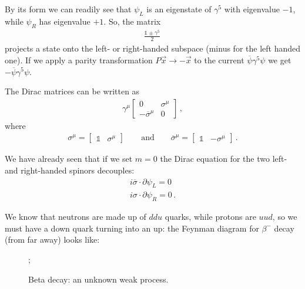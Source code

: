\documentclass[main.tex]{subfiles}
\begin{document}
By its form we can readily see that \(\psi_{L}\) is an eigenstate of \(\gamma^{5}\) with eigenvalue \(-1\), while \(\psi_{R}\) has eigenvalue \(+1\). 
So, the matrix 
%
\begin{align}
\frac{\mathbb{1} \pm \gamma^{5}}{2} 
\,
\end{align}
%
projects a state onto the left- or right-handed subspace (minus for the left handed one).
If we apply a parity transformation \(P \vec{x} \to - \vec{x}\) to the current \(\overline{\psi} \gamma^{5} \psi \) we get \(- \overline{\psi} \gamma^{5} \psi \). 

The Dirac matrices can be written as 
%
\begin{subequations}
\begin{align}
\gamma^{\mu } \left[\begin{array}{cc}
0 & \sigma^{\mu }  \\ 
-\overline{\sigma}^{\mu } & 0
\end{array}\right]
\,,
\end{align}
\end{subequations}
%
where 
%
\begin{align}
\sigma^{\mu } = \left[\begin{array}{cc}
\mathbb{1} & \sigma^{\mu }
\end{array}\right]
\qquad \text{and} \qquad
\overline{\sigma}^{\mu } = \left[\begin{array}{cc}
\mathbb{1} & - \sigma^{\mu }
\end{array}\right]
\,.
\end{align}
%

We have already seen that if we set \(m=0\) the Dirac equation for the two left- and right-handed spinors decouples:
%
\begin{subequations}
\begin{align}
i \overline{\sigma} \cdot \partial \psi_{L} =0\\
i \sigma \cdot \partial \psi_{R}=0
\,.
\end{align}
\end{subequations}

We know that neutrons are made up of \(ddu\) quarks, while protons are \(uud\), so we must have a down quark turning into an up:
the Feynman diagram for \(\beta^{-}\) decay (from far away) looks like:
\begin{figure}[ht]
\centering
{};
\caption{Beta decay: an unknown weak process.}
\label{fig:beta-decay}
\end{figure}
\end{document}
